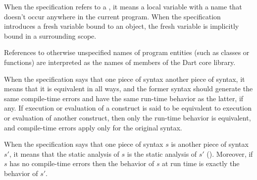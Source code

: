 \documentclass[makeidx]{article}
\begin{document}
\LMHash{}%
When the specification refers to a
,
it means a local variable with a name that doesn't occur anywhere
in the current program.
When the specification introduces a fresh variable bound to an object,
the fresh variable is implicitly bound in a surrounding scope.

\LMHash{}%
References to otherwise unspecified names of program entities
(such as classes or functions)
are interpreted as the names of members of the Dart core library.



\LMHash{}%
When the specification says that one piece of syntax 
another piece of syntax, it means that it is equivalent in all ways,
and the former syntax should generate the same compile-time errors
and have the same run-time behavior as the latter, if any.
If execution or evaluation of a construct is said to be
equivalent to execution or evaluation of another construct,
then only the run-time behavior is equivalent,
and compile-time errors apply only for the original syntax.

\LMHash{}%
When the specification says that one piece of syntax $s$ is
another piece of syntax $s'$,
it means that the static analysis of $s$ is the static analysis of $s'$
().
Moreover, if $s$ has no compile-time errors then
the behavior of $s$ at run time is exactly the behavior of $s'$.

\end{document}
